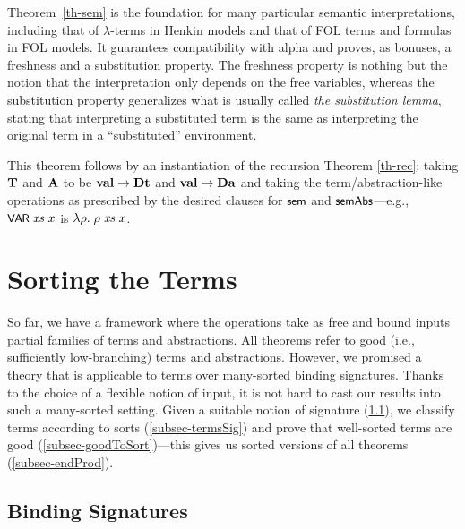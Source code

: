 \documentclass{llncs}
\begin{document}
Theorem~\ref{th-sem} is the foundation for many particular semantic interpretations, including 
that of $\lambda$-terms in Henkin models and that of FOL terms and formulas in FOL models. 
It guarantees compatibility with alpha and proves, as bonuses, a freshness and a substitution 
property.   
The freshness property is nothing but the notion that the interpretation 
only depends on the free variables, whereas the substitution property generalizes 
what is usually called {\em the substitution lemma}, stating that interpreting a substituted term 
is the same as interpreting the original term in a ``substituted'' environment. 

This theorem follows by an instantiation of the recursion Theorem \ref{th-rec}: 
taking $\bf T$ and $\bf A$ to be $\bf val \rightarrow \bf Dt$ and $\bf val \rightarrow \bf Da$ and taking the 
term/abstraction-like operations as prescribed by the desired clauses for $\mbox{\rm\textsf{\small sem}}$ and $\mbox{\rm\textsf{\small semAbs}}$---e.g., 
$\mbox{{\rm \textsf{\small V$\hspace*{-0.1ex}$A$\hspace*{-0.1ex}$R}}}\;\mbox{\textit{xs}}\;x$ is $\lambda \rho.\;\rho\;\mbox{\textit{xs}}\;x$. 







\section{Sorting the Terms}  \label{sec-sorting}  


So far, we have %
a framework where the operations take as 
free and bound inputs partial families of terms and abstractions.  
All theorems refer to good (i.e., sufficiently 
low-branching) terms and abstractions. 
%
%
However, we promised a theory that is applicable to terms over many-sorted binding signatures. 
%
Thanks to the choice of a flexible notion of input, it is not hard 
to cast our results into such a many-sorted setting. 
Given a suitable 
notion of signature (\ref{subsec-sign}), 
we classify terms according to sorts (\ref{subsec-termsSig}) 
and prove that well-sorted terms are good (\ref{subsec-goodToSort})---this 
gives us sorted versions of all theorems (\ref{subsec-endProd}). 


\subsection{Binding Signatures} \label{subsec-sign}
\end{document}

